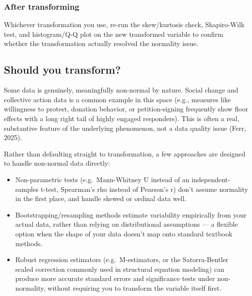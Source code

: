 \documentclass[
  letterpaper,
  DIV=11,
  numbers=noendperiod]{scrreprt}
\providecommand{\tightlist}{%
  \setlength{\itemsep}{0pt}\setlength{\parskip}{0pt}}\usepackage{longtable,booktabs,array}
\begin{document}
\subsubsection{After transforming}\label{after-transforming}

Whichever transformation you use, re-run the skew/kurtosis check,
Shapiro-Wilk test, and histogram/Q-Q plot on the new transformed
variable to confirm whether the transformation actually resolved the
normality issue.

\subsection{Should you transform?}\label{should-you-transform}

Some data is genuinely, meaningfully non-normal by nature. Social change
and collective action data is a common example in this space (e.g.,
measures like willingness to protest, donation behavior, or
petition-signing frequently show floor effects with a long right tail of
highly engaged responders). This is often a real, substantive feature of
the underlying phenomenon, not a data quality issue (Ferr, 2025).

Rather than defaulting straight to transformation, a few approaches are
designed to handle non-normal data directly:

\begin{itemize}
\tightlist
\item
  Non-parametric tests (e.g.~Mann-Whitney U instead of an
  independent-samples t-test, Spearman's rho instead of Pearson's r)
  don't assume normality in the first place, and handle skewed or
  ordinal data well.
\end{itemize}

\begin{itemize}
\tightlist
\item
  Bootstrapping/resampling methods estimate variability empirically from
  your actual data, rather than relying on distributional assumptions
  --- a flexible option when the shape of your data doesn't map onto
  standard textbook methods.
\end{itemize}

\begin{itemize}
\tightlist
\item
  Robust regression estimators (e.g.~M-estimators, or the
  Satorra-Bentler scaled correction commonly used in structural equation
  modeling) can produce more accurate standard errors and significance
  tests under non-normality, without requiring you to transform the
  variable itself first.
\end{itemize}
\end{document}
